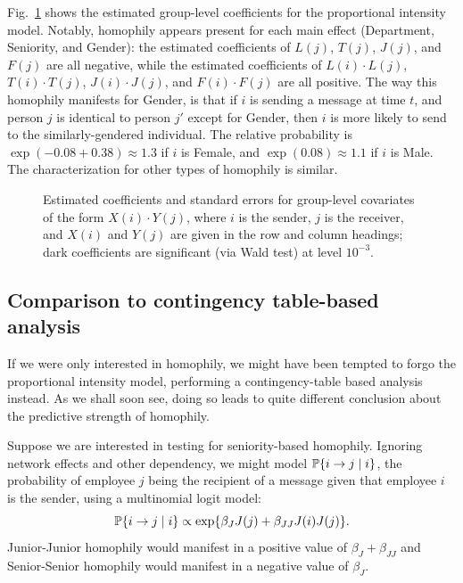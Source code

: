 \documentclass[final]{statsoc}
\begin{document}
Fig.~\ref{T:group-dynamic} shows the estimated group-level coefficients for
the proportional intensity model.  Notably, homophily appears present for each
main effect (Department, Seniority, and Gender): the estimated coefficients of
$L(j)$, $T(j)$, $J(j)$, and $F(j)$ are all negative, while the estimated
coefficients of $L(i) \cdot L(j)$, $T(i) \cdot T(j)$, $J(i) \cdot J(j)$, and
$F(i) \cdot F(j)$ are all positive.  The way this homophily manifests for
Gender, is that if $i$ is sending a message at time $t$, and person $j$ is
identical to person $j'$ except for Gender, then $i$ is more likely to send to
the similarly-gendered individual.  The relative probability is $\exp(-0.08 +
0.38) \approx 1.3$ if $i$ is Female, and $\exp(0.08) \approx 1.1$ if $i$ is
Male.  The characterization for other types of homophily is similar.

\begin{figure}
  \centering
  \makebox[\textwidth]{
    \scriptsize
    
  }
  \caption{
    Estimated coefficients and standard errors for group-level covariates
    of the form $X(i) \cdot Y(j)$, where $i$ is the sender, $j$ is the
    receiver, and $X(i)$ and $Y(j)$ are given in the row and column
    headings; dark coefficients are significant (via Wald test) at
    level $10^{-3}$.
  }
  \label{T:group-dynamic}
\end{figure}


\subsection{Comparison to contingency table-based analysis}

If we were only interested in homophily, we might have been tempted to forgo
the proportional intensity model, performing a contingency-table based analysis
instead.  As we shall soon see, doing so leads to quite different conclusion
about the predictive strength of homophily.

Suppose we are interested in testing for seniority-based homophily.  Ignoring
network effects and other dependency, we might model $\mathbb{P}\{ i \to j \mid i
\}$, the probability of employee $j$ being the recipient of a message given
that employee $i$ is the sender, using a multinomial logit model:
\[
  \mathbb{P}\{ i \to j \mid i \}
    \propto \exp\{ \beta_J J(j) + \beta_{JJ} J(i) J(j) \}.
\]
Junior-Junior homophily would manifest in a positive value of
$\beta_{J} + \beta_{JJ}$ and Senior-Senior homophily would manifest in
a negative value of $\beta_J$.
\end{document}
